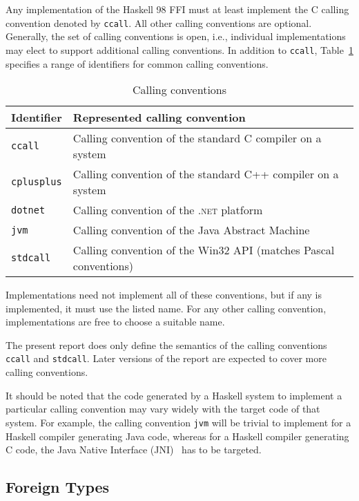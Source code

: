 \documentclass[a4paper,twoside]{article}
\newcommand{\code}[1]{\texttt{#1}}      %
\begin{document}
Any implementation of the Haskell 98 FFI must at least implement the C calling
convention denoted by \code{ccall}.  All other calling conventions are
optional.  Generally, the set of calling conventions is open, i.e., individual
implementations may elect to support additional calling conventions.  In
addition to \code{ccall}, Table~\ref{tab:callconv} specifies a range of
identifiers for common calling conventions.
%
\begin{table}[tbp]
  \begin{center}
    \begin{tabular}{|l|l|}
      \hline
      Identifier & Represented calling convention\\
      \hline\hline
      \code{ccall} 
      & Calling convention of the standard C compiler on a system\\
      \code{cplusplus}
      & Calling convention of the standard C{+}{+} compiler on a system\\
      \code{dotnet}
      & Calling convention of the \textsc{.net} platform\\
      \code{jvm} 
      & Calling convention of the Java Abstract Machine\\
      \code{stdcall}
      & Calling convention of the Win32 API (matches Pascal conventions)\\
      \hline
    \end{tabular}
    \caption{Calling conventions}
    \label{tab:callconv}
  \end{center}
\end{table}
%
Implementations need not implement all of these conventions, but if any is
implemented, it must use the listed name.  For any other calling convention,
implementations are free to choose a suitable name.

The present report does only define the semantics of the calling conventions
\code{ccall} and \code{stdcall}.  Later versions of the report are expected to
cover more calling conventions.

It should be noted that the code generated by a Haskell system to implement a
particular calling convention may vary widely with the target code of that
system.  For example, the calling convention \code{jvm} will be trivial to
implement for a Haskell compiler generating Java code, whereas for a Haskell
compiler generating C code, the Java Native Interface (JNI)~\cite{liang:JNI}
has to be targeted.

\subsection{Foreign Types}
\label{sec:foreign-types}
\end{document}
